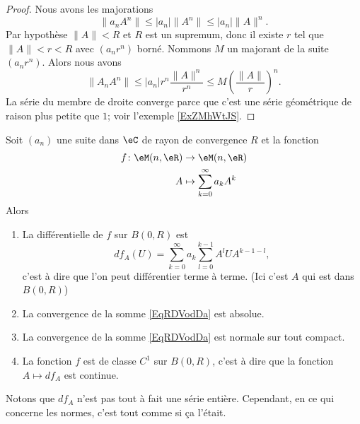 \begin{proof}
    Nous avons les majorations
    \begin{equation}
        \| a_n A^n\|\leq | a_n |\| A^n \|\leq | a_n |\| A \|^n.
    \end{equation}
    Par hypothèse \( \| A \|<R\) et \( R\) est un supremum, donc il existe \( r\) tel que \( \| A \|<r<R\) avec \( (a_nr^n)\) borné. Nommons \( M\) un majorant de la suite \( (a_nr^n)\). Alors nous avons
    \begin{equation}
        \| A_nA^n \|\leq | a_n |r^n\frac{ \| A \|^n }{ r^n }\leq M\left( \frac{ \| A \| }{ r } \right)^n.
    \end{equation}
    La série du membre de droite converge parce que c'est une série géométrique de raison plus petite que \( 1\); voir l'exemple \ref{ExZMhWtJS}.
\end{proof}

\begin{proposition} \label{PropAMBXKgV}
    Soit \( (a_n)\) une suite dans \( \eC\) de rayon de convergence \( R\) et la fonction
    \begin{equation}
        \begin{aligned}
            f\colon \eM(n,\eR)&\to \eM(n,\eR) \\
            A&\mapsto \sum_{k=0}^{\infty}a_kA^k 
        \end{aligned}
    \end{equation}
    Alors
    \begin{enumerate}
        \item
            La différentielle de \( f\) sur \( B(0,R)\) est
            \begin{equation}    \label{EqRDVodDa}
                df_A(U)=\sum_{k=0}^{\infty}a_k\sum_{l=0}^{k-1}A^lUA^{k-1-l},
            \end{equation}
            c'est à dire que l'on peut différentier terme à terme. (Ici c'est \( A\) qui est dans \( B(0,R)\))
        \item
            La convergence de la somme \ref{EqRDVodDa} est absolue.
        \item
            La convergence de la somme \ref{EqRDVodDa} est normale sur tout compact.
        \item
            La fonction \( f\) est de classe \( C^1\) sur \( B(0,R)\), c'est à dire que la fonction \( A\mapsto df_A\) est continue.
    \end{enumerate}
\end{proposition}
Notons que \( df_A\) n'est pas tout à fait une série entière. Cependant, en ce qui concerne les normes, c'est tout comme si ça l'était.

